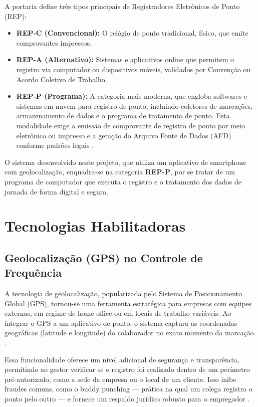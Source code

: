 \par A portaria define três tipos principais de Registradores Eletrônicos de Ponto (REP):
\begin{itemize}
    \item \textbf{REP-C (Convencional):} O relógio de ponto tradicional, físico, que emite comprovantes impressos.
    \item \textbf{REP-A (Alternativo):} Sistemas e aplicativos online que permitem o registro via computador ou dispositivos móveis, validados por Convenção ou Acordo Coletivo de Trabalho.
    \item \textbf{REP-P (Programa):} A categoria mais moderna, que engloba softwares e sistemas em nuvem para registro de ponto, incluindo coletores de marcações, armazenamento de dados e o programa de tratamento de ponto. Esta modalidade exige a emissão de comprovante de registro de ponto por meio eletrônico ou impresso e a geração do Arquivo Fonte de Dados (AFD) conforme padrões legais \cite{RequisitosREPP}.
\end{itemize}
\par O sistema desenvolvido neste projeto, que utiliza um aplicativo de smartphone com geolocalização, enquadra-se na categoria \textbf{REP-P}, por se tratar de um programa de computador que executa o registro e o tratamento dos dados de jornada de forma digital e segura.

\section{Tecnologias Habilitadoras}

\subsection{Geolocalização (GPS) no Controle de Frequência}
\par A tecnologia de geolocalização, popularizada pelo Sistema de Posicionamento Global (GPS), tornou-se uma ferramenta estratégica para empresas com equipes externas, em regime de home office ou em locais de trabalho variáveis. Ao integrar o GPS a um aplicativo de ponto, o sistema captura as coordenadas geográficas (latitude e longitude) do colaborador no exato momento da marcação \cite{GPSControlePonto}.

\par Essa funcionalidade oferece um nível adicional de segurança e transparência, permitindo ao gestor verificar se o registro foi realizado dentro de um perímetro pré-autorizado, como a sede da empresa ou o local de um cliente. Isso inibe fraudes comuns, como o buddy punching — prática na qual um colega registra o ponto pelo outro — e fornece um respaldo jurídico robusto para o empregador \cite{GPSControlePonto}.

